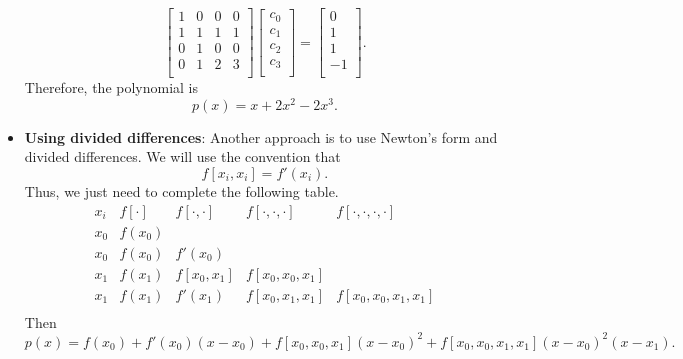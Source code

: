 \documentclass{report}
\begin{document}
\begin{itemize}
$$\begin{bmatrix}
        1 & 0 & 0 &   0 \\
        1 & 1 & 1 &   1 \\
        0 &   1 & 0 & 0 \\
        0 &   1 & 2 & 3 \\
    \end{bmatrix}
    \begin{bmatrix}
        c_0\\c_1\\c_2\\c_3\\
    \end{bmatrix}
    =
    \begin{bmatrix}
        0\\1\\1\\-1\\
    \end{bmatrix}.
    $$
    \bigbreak \noindent 
    Therefore, the polynomial is
$$p(x) = x + 2x^2 - 2x^3.$$
\bigbreak \noindent 
\item \textbf{Using divided differences}:
    Another approach is to use Newton's form and divided differences.
    \bigbreak \noindent 
    We will use the convention that 
    $$f[x_i,x_i] = f'(x_i).$$
    Thus, we just need to complete the following table.
    $$
    \begin{array}{c|cccc}
        x_i & f[\cdot] & f[\cdot,\cdot] & f[\cdot,\cdot,\cdot] & f[\cdot,\cdot,\cdot,\cdot]\\ 
        \hline
        x_0 & f(x_0) & & \\
        x_0 & f(x_0) & f'(x_0) & \\
        x_1 & f(x_1) & f[x_0,x_1] & f[x_0,x_0,x_1] \\
        x_1 & f(x_1) & f'(x_1) & f[x_0,x_1,x_1] & f[x_0,x_0,x_1,x_1] \\
    \end{array}
    $$
    Then 
    $$p(x) = f(x_0) + f'(x_0)(x-x_0) + f[x_0,x_0,x_1](x-x_0)^2 + f[x_0,x_0,x_1,x_1](x-x_0)^2(x-x_1).$$





    \end{itemize}

    \pagebreak 
\end{document}
